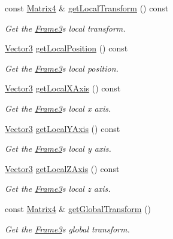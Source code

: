 \begin{DoxyCompactItemize}
const \hyperlink{class_magnum_1_1_matrix4}{Matrix4} \& \hyperlink{class_magnum_1_1_frame3_a024b5f957cbb324a48e16b264d960410}{get\+Local\+Transform} () const 
\begin{DoxyCompactList}\small\item\em Get the \hyperlink{class_magnum_1_1_frame3}{Frame3}\textquotesingle{}s local transform. \end{DoxyCompactList}\item 
\hyperlink{class_magnum_1_1_vector3}{Vector3} \hyperlink{class_magnum_1_1_frame3_ad24c8641061003aa681a85e22ba80f3b}{get\+Local\+Position} () const 
\begin{DoxyCompactList}\small\item\em Get the \hyperlink{class_magnum_1_1_frame3}{Frame3}\textquotesingle{}s local position. \end{DoxyCompactList}\item 
\hyperlink{class_magnum_1_1_vector3}{Vector3} \hyperlink{class_magnum_1_1_frame3_a66b3a75ce99c82cc6568598e4586e474}{get\+Local\+X\+Axis} () const 
\begin{DoxyCompactList}\small\item\em Get the \hyperlink{class_magnum_1_1_frame3}{Frame3}\textquotesingle{}s local x axis. \end{DoxyCompactList}\item 
\hyperlink{class_magnum_1_1_vector3}{Vector3} \hyperlink{class_magnum_1_1_frame3_ad8865148b70218e99bc164e096386911}{get\+Local\+Y\+Axis} () const 
\begin{DoxyCompactList}\small\item\em Get the \hyperlink{class_magnum_1_1_frame3}{Frame3}\textquotesingle{}s local y axis. \end{DoxyCompactList}\item 
\hyperlink{class_magnum_1_1_vector3}{Vector3} \hyperlink{class_magnum_1_1_frame3_ac8ec84b150a39cf6969902fcfdcd764e}{get\+Local\+Z\+Axis} () const 
\begin{DoxyCompactList}\small\item\em Get the \hyperlink{class_magnum_1_1_frame3}{Frame3}\textquotesingle{}s local z axis. \end{DoxyCompactList}\item 
const \hyperlink{class_magnum_1_1_matrix4}{Matrix4} \& \hyperlink{class_magnum_1_1_frame3_a57a2f755811f485d9602103609c78d68}{get\+Global\+Transform} ()
\begin{DoxyCompactList}\small\item\em Get the \hyperlink{class_magnum_1_1_frame3}{Frame3}\textquotesingle{}s global transform. \end{DoxyCompactList}\item 

\end{DoxyCompactItemize}
